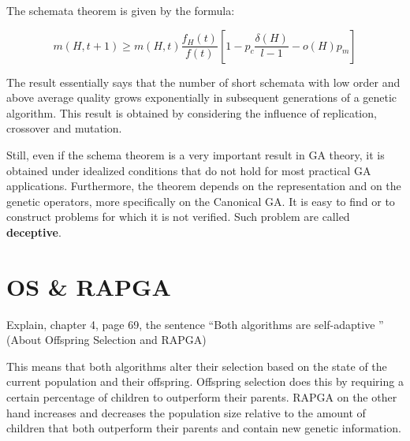 \documentclass[../main.tex]{subfiles}
\begin{document}
\begin{solution}
The schemata theorem is given by the formula:

\begin{equation}
    m(H,t+1) \geq m(H,t) \frac{f_H(t)}{f(t)} [1 - p_c \frac{\delta(H) }{l-1} - o(H)p_m]
\end{equation}

The result essentially says that the number of short schemata with low order and above average quality grows
exponentially in subsequent generations of a genetic algorithm. This result is obtained by considering the influence of
replication, crossover and mutation.

Still, even if the schema theorem is a very important result in GA theory, it is obtained under idealized conditions
that do not hold for most practical GA applications. Furthermore, the theorem depends on the representation and on the
genetic operators, more specifically on the Canonical GA. It is easy to find or to construct problems for which it is
not verified. Such problem are called \textbf{deceptive}.
\end{solution}

\section{OS \& RAPGA}
\begin{question}
Explain, chapter 4, page 69, the sentence ``Both algorithms are self-adaptive \textellipsis'' (About Offspring
Selection and RAPGA)
\end{question}
\begin{solution}
This means that both algorithms alter their selection based on the state of the current population and their offspring.
Offspring selection does this by requiring a certain percentage of children to outperform their parents. RAPGA on the
other hand increases and decreases the population size relative to the amount of children that both outperform their
parents and contain new genetic information.
\end{solution}
\end{document}
